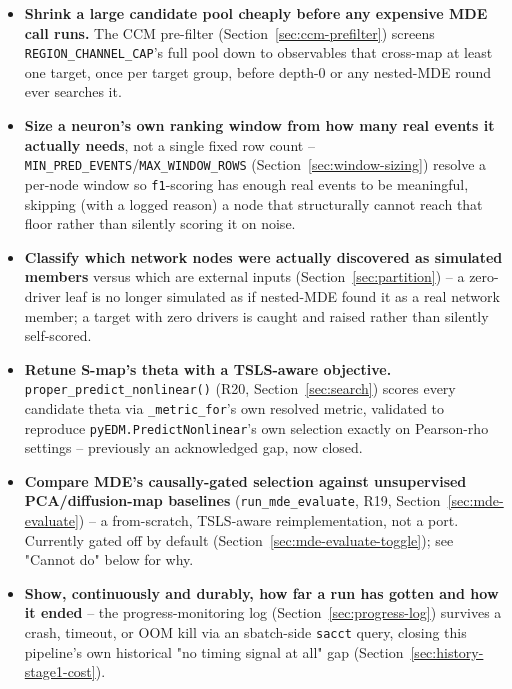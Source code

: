 \documentclass[11pt]{article}
\begin{document}
\begin{itemize}
  \item \textbf{Shrink a large candidate pool cheaply before any expensive MDE call runs.} The CCM pre-filter (Section~\ref{sec:ccm-prefilter}) screens \texttt{REGION\_CHANNEL\_CAP}'s full pool down to observables that cross-map at least one target, once per target group, before depth-0 or any nested-MDE round ever searches it.
  \item \textbf{Size a neuron's own ranking window from how many real events it actually needs}, not a single fixed row count -- \texttt{MIN\_PRED\_EVENTS}/\texttt{MAX\_WINDOW\_ROWS} (Section~\ref{sec:window-sizing}) resolve a per-node window so \texttt{f1}-scoring has enough real events to be meaningful, skipping (with a logged reason) a node that structurally cannot reach that floor rather than silently scoring it on noise.
  \item \textbf{Classify which network nodes were actually discovered as simulated members} versus which are external inputs (Section~\ref{sec:partition}) -- a zero-driver leaf is no longer simulated as if nested-MDE found it as a real network member; a target with zero drivers is caught and raised rather than silently self-scored.
  \item \textbf{Retune S-map's theta with a TSLS-aware objective.} \texttt{proper\_predict\_nonlinear()} (R20, Section~\ref{sec:search}) scores every candidate theta via \texttt{\_metric\_for}'s own resolved metric, validated to reproduce \texttt{pyEDM.PredictNonlinear}'s own selection exactly on Pearson-rho settings -- previously an acknowledged gap, now closed.
  \item \textbf{Compare MDE's causally-gated selection against unsupervised PCA/diffusion-map baselines} (\texttt{run\_mde\_evaluate}, R19, Section~\ref{sec:mde-evaluate}) -- a from-scratch, TSLS-aware reimplementation, not a port. Currently gated off by default (Section~\ref{sec:mde-evaluate-toggle}); see "Cannot do" below for why.
  \item \textbf{Show, continuously and durably, how far a run has gotten and how it ended} -- the progress-monitoring log (Section~\ref{sec:progress-log}) survives a crash, timeout, or OOM kill via an sbatch-side \texttt{sacct} query, closing this pipeline's own historical "no timing signal at all" gap (Section~\ref{sec:history-stage1-cost}).
\end{itemize}
\end{document}
